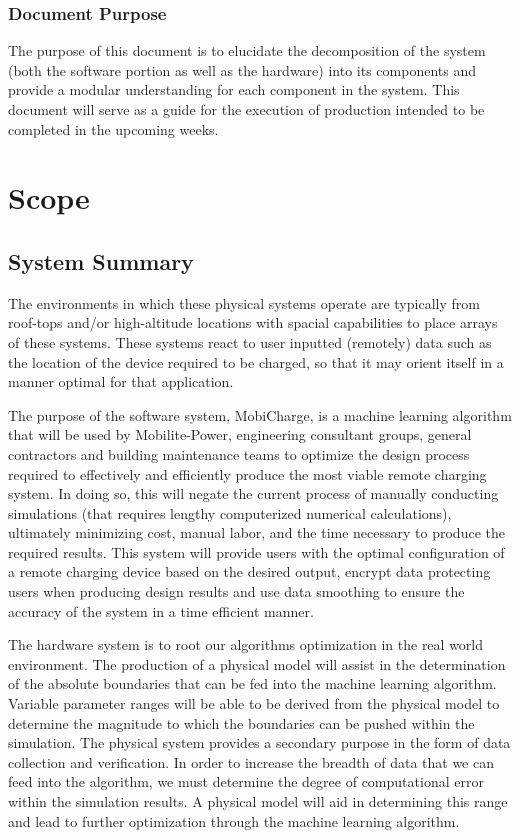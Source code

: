 \documentclass[12pt, titlepage]{article}
\begin{document}
\subsubsection{Document Purpose}
The purpose of this document is to elucidate the decomposition of the system (both the software portion as well as the hardware) into its components and provide a modular understanding for each component in the system. This document will serve as a guide for the execution of production intended to be completed in the upcoming weeks.


\section{Scope}
\subsection{System Summary}
The environments in which these physical systems operate are typically from roof-tops and/or high-altitude locations with spacial capabilities to place arrays of these systems. These systems react to user inputted (remotely) data such as the location of the device required to be charged, so that it may orient itself in a manner optimal for that application. 
\par
The purpose of the software system, MobiCharge, is a machine learning algorithm that will be used by Mobilite-Power, engineering consultant groups, general contractors and building maintenance teams to optimize the design process required to effectively and efficiently produce the most viable remote charging system. In doing so, this will negate the current process of manually conducting simulations (that requires lengthy computerized numerical calculations), ultimately minimizing cost, manual labor, and the time necessary to produce the required results. This system will provide users with the optimal configuration of a remote charging device based on the desired output, encrypt data protecting users when producing design results and use data smoothing to ensure the accuracy of the system in a time efficient manner.
\par
The hardware system is to root our algorithms optimization in the real world environment. The production of a physical model will assist in the determination of the absolute boundaries that can be fed into the machine learning algorithm. Variable parameter ranges will be able to be derived from the physical model to determine the magnitude to which the boundaries can be pushed within the simulation. The physical system provides a secondary purpose in the form of data collection and verification. In order to increase the breadth of data that we can feed into the algorithm, we must determine the degree of computational error within the simulation results. A physical model will aid in determining this range and lead to further optimization through the machine learning algorithm.
\end{document}
